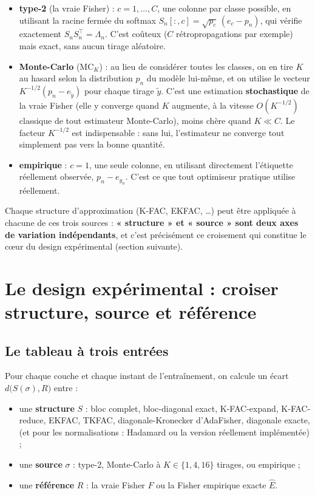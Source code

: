 \documentclass[11pt,a4paper]{article}
\begin{document}
\begin{itemize}
\item \textbf{type-2} (la vraie Fisher) : $c=1,\dots,C$, une colonne par classe possible, en
utilisant la racine fermée du softmax $S_n[:,c]=\sqrt{p_c}\,(e_c-p_n)$, qui vérifie exactement
$S_nS_n^\top = \Lambda_n$. C'est coûteux ($C$ rétropropagations par exemple) mais exact, sans aucun
tirage aléatoire.
\item \textbf{Monte-Carlo} ($\mathrm{MC}_K$) : au lieu de considérer toutes les classes, on en tire
$K$ au hasard selon la distribution $p_n$ du modèle lui-même, et on utilise le vecteur
$K^{-1/2}(p_n - e_{\tilde y})$ pour chaque tirage $\tilde y$. C'est une estimation \textbf{stochastique}
de la vraie Fisher (elle y converge quand $K$ augmente, à la vitesse $O(K^{-1/2})$ classique de tout
estimateur Monte-Carlo), moins chère quand $K\ll C$. Le facteur $K^{-1/2}$ est indispensable : sans
lui, l'estimateur ne converge tout simplement pas vers la bonne quantité.
\item \textbf{empirique} : $c=1$, une seule colonne, en utilisant directement l'étiquette réellement
observée, $p_n-e_{y_n}$. C'est ce que tout optimiseur pratique utilise réellement.
\end{itemize}

Chaque structure d'approximation (K-FAC, EKFAC, \dots) peut être appliquée à chacune de ces trois
sources : \textbf{« structure » et « source » sont deux axes de variation indépendants}, et c'est
précisément ce croisement qui constitue le cœur du design expérimental (section suivante).

\section{Le design expérimental : croiser structure, source et référence}
\label{sec:design}

\subsection{Le tableau à trois entrées}

Pour chaque couche et chaque instant de l'entraînement, on calcule un écart $d\big(S(\sigma), R\big)$
entre :
\begin{itemize}
\item une \textbf{structure} $S$ : bloc complet, bloc-diagonal exact, K-FAC-expand, K-FAC-reduce,
EKFAC, TKFAC, diagonale-Kronecker d'AdaFisher, diagonale exacte, (et pour les normalisations :
Hadamard ou la version réellement implémentée) ;
\item une \textbf{source} $\sigma$ : type-2, Monte-Carlo à $K\in\{1,4,16\}$ tirages, ou empirique ;
\item une \textbf{référence} $R$ : la vraie Fisher $F$ ou la Fisher empirique exacte $\hat E$.
\end{itemize}
\end{document}
